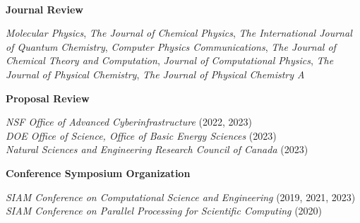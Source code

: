 \documentclass[10pt]{res} %
\begin{document}
\begin{resume}
~\\
\centerline{\bf Journal Review}
\vspace{-20pt}
\begin{center}
  \emph{Molecular Physics}, 
  \emph{The Journal of Chemical Physics}, 
  \emph{The International Journal of Quantum Chemistry}, 
  \emph{Computer Physics Communications},
  \emph{The Journal of Chemical Theory and Computation},
  \emph{Journal of Computational Physics},
  \emph{The Journal of Physical Chemistry}, 
  \emph{The Journal of Physical Chemistry A} 
\end{center}

\centerline{\bf Proposal Review}
\vspace{-15pt}
\begin{center}
\emph{NSF Office of Advanced Cyberinfrastructure} \hfill (2022, 2023) \\
\emph{DOE Office of Science, Office of Basic Energy Sciences} \hfill (2023) \\
\emph{Natural Sciences and Engineering Research Council of Canada} \hfill (2023)
\end{center}

\centerline{\bf Conference Symposium Organization}
\vspace{-15pt}
\begin{center}
\emph{SIAM Conference on Computational Science and Engineering}        \hfill (2019, 2021, 2023) \\
\emph{SIAM Conference on Parallel Processing for Scientific Computing} \hfill (2020)
\end{center}


\end{resume}
\end{document}

